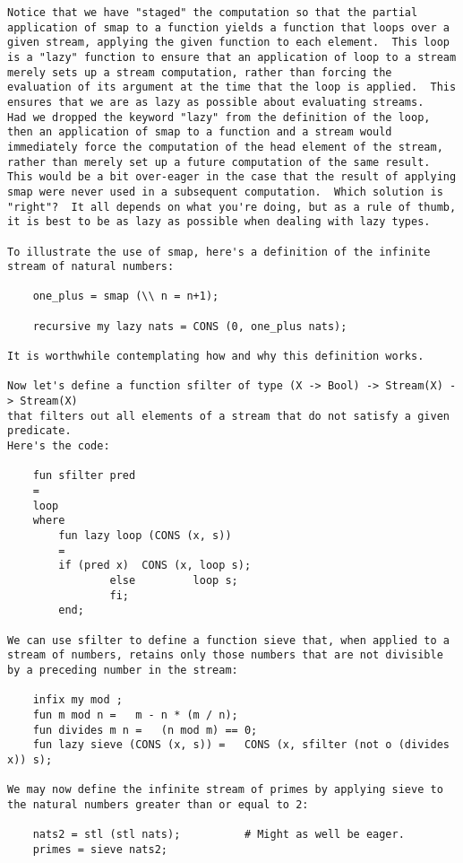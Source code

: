 \begin{verbatim}
Notice that we have "staged" the computation so that the partial 
application of smap to a function yields a function that loops over a 
given stream, applying the given function to each element.  This loop 
is a "lazy" function to ensure that an application of loop to a stream 
merely sets up a stream computation, rather than forcing the 
evaluation of its argument at the time that the loop is applied.  This 
ensures that we are as lazy as possible about evaluating streams. 
Had we dropped the keyword "lazy" from the definition of the loop, 
then an application of smap to a function and a stream would 
immediately force the computation of the head element of the stream, 
rather than merely set up a future computation of the same result. 
This would be a bit over-eager in the case that the result of applying 
smap were never used in a subsequent computation.  Which solution is 
"right"?  It all depends on what you're doing, but as a rule of thumb, 
it is best to be as lazy as possible when dealing with lazy types. 
 
To illustrate the use of smap, here's a definition of the infinite 
stream of natural numbers: 
 
    one_plus = smap (\\ n = n+1);  
  
    recursive my lazy nats = CONS (0, one_plus nats); 
 
It is worthwhile contemplating how and why this definition works. 
 
Now let's define a function sfilter of type (X -> Bool) -> Stream(X) -> Stream(X) 
that filters out all elements of a stream that do not satisfy a given predicate. 
Here's the code: 
 
    fun sfilter pred 
	= 
	loop 
	where 
	    fun lazy loop (CONS (x, s)) 
		= 
		if (pred x)  CONS (x, loop s); 
                else         loop s; 
                fi; 
        end; 
  
We can use sfilter to define a function sieve that, when applied to a 
stream of numbers, retains only those numbers that are not divisible 
by a preceding number in the stream: 
 
    infix my mod ;  
    fun m mod n =   m - n * (m / n);  
    fun divides m n =   (n mod m) == 0;  
    fun lazy sieve (CONS (x, s)) =   CONS (x, sfilter (not o (divides x)) s);  
 
We may now define the infinite stream of primes by applying sieve to 
the natural numbers greater than or equal to 2: 
 
    nats2 = stl (stl nats);          # Might as well be eager.  
    primes = sieve nats2; 
 

\end{verbatim}
